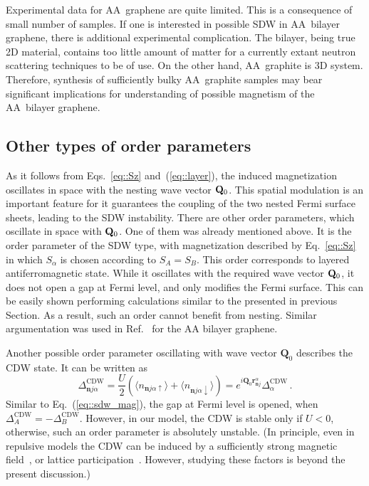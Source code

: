 \documentclass[prb,twocolumn,showpacs,aps,superscriptaddress,floatfix]{revtex4}
\begin{document}
Experimental data for AA~graphene are quite limited. This is a consequence
of small number of samples. If one is interested in possible SDW in
AA~bilayer graphene, there is additional experimental complication. The
bilayer, being true 2D material, contains too little amount of matter for a
currently extant neutron scattering techniques to be of use. On the other
hand, AA~graphite is 3D system. Therefore, synthesis of sufficiently bulky
AA~graphite samples may bear significant implications for understanding of
possible magnetism of the AA~bilayer graphene.

\subsection{Other types of order parameters}

As it follows from
Eqs.~\eqref{eq::Sz}
and~(\ref{eq::layer}),
the induced magnetization oscillates in space with the nesting wave vector
${\bf Q}_0$.
This spatial modulation is an important feature for it guarantees the
coupling of the two nested Fermi surface sheets, leading to the SDW
instability. There are other order parameters, which oscillate in space
with
${\bf Q}_0$.
One of them was already mentioned above. It is the order parameter of the
SDW type, with magnetization described by
Eq.~\eqref{eq::Sz}
in which
$S_{\alpha}$
is chosen according to
$S_A=S_B$.
This order corresponds to layered antiferromagnetic state. While it
oscillates with the required wave vector
${\bf Q}_0$,
it does not open a gap at Fermi level, and only modifies the Fermi surface.
This can be easily shown performing calculations similar to the presented
in previous Section. As a result, such an order cannot benefit from
nesting. Similar argumentation was used in
Ref.~
for the AA bilayer graphene.

Another possible order parameter oscillating with wave vector
$\mathbf{Q}_0$
describes the CDW state. It can be written as
\begin{equation}\label{DeltaniaCDW}
\Delta^{\text{CDW}}_{\mathbf{n}j\alpha}=\frac{U}{2}\left(\langle n_{\mathbf{n}j\alpha\uparrow}\rangle+\langle n_{\mathbf{n}j\alpha\downarrow}\rangle\right)
=e^{i\mathbf{Q}_0\mathbf{r}_{\mathbf{n}j}^{\alpha}}\Delta^{\text{CDW}}_{\alpha}\,.
\end{equation}
Similar to
Eq.~(\ref{eq::sdw_mag}),
the gap at Fermi level is opened, when
$\Delta^{\text{CDW}}_{A}=-\Delta^{\text{CDW}}_{B}$.
However, in our model, the CDW is stable only if
$U<0$,
otherwise, such an order parameter is absolutely unstable. (In principle,
even in repulsive models the CDW can be induced by a sufficiently strong
magnetic
field~\cite{cdw_magfield_theor1981,cdw_magfield_exp2017,
cdw_magfield_exp2001},
or lattice
participation~\cite{cdw_mazin2008}.
However, studying these factors is beyond the present discussion.)
\end{document}
